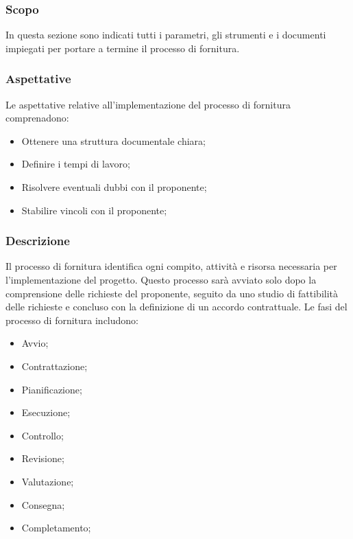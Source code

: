 \documentclass{article}
\begin{document}
\subsubsection{Scopo}
In questa sezione sono indicati tutti i parametri, gli strumenti e i documenti impiegati per portare a termine il processo di fornitura.

\subsubsection{Aspettative}
Le aspettative relative all'implementazione del processo di fornitura comprenadono:
\begin{itemize}
    \item Ottenere una struttura documentale chiara;
    \item Definire i tempi di lavoro;
    \item Risolvere eventuali dubbi con il proponente;
    \item Stabilire vincoli con il proponente;
\end{itemize}

\subsubsection{Descrizione}
Il processo di fornitura identifica ogni compito, attività e risorsa necessaria per l'implementazione del progetto. Questo processo sarà avviato solo dopo la comprensione delle richieste del proponente, seguito da uno studio di fattibilità delle richieste e concluso con la definizione di un accordo contrattuale. Le fasi del processo di fornitura includono:
\begin{itemize}
    \item Avvio;
    \item Contrattazione;
    \item Pianificazione;
    \item Esecuzione;
    \item Controllo;
    \item Revisione;
    \item Valutazione;
    \item Consegna;
    \item Completamento;
\end{itemize}
\end{document}
